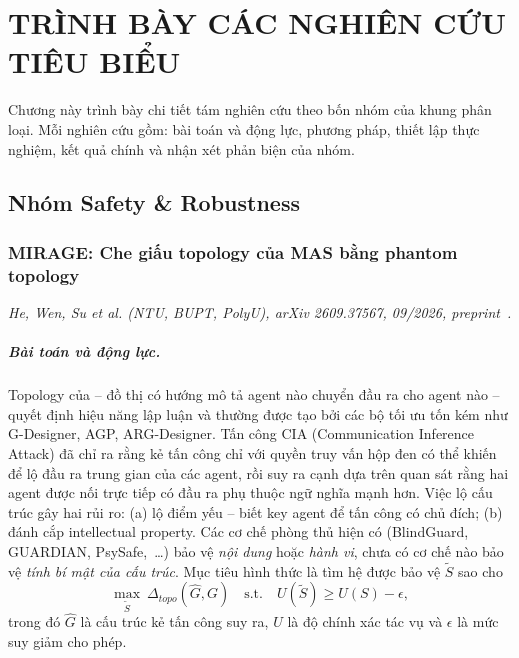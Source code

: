 \chapter{TRÌNH BÀY CÁC NGHIÊN CỨU TIÊU BIỂU}
\label{chap:papers}

Chương này trình bày chi tiết tám nghiên cứu theo bốn nhóm của khung phân loại. Mỗi nghiên cứu gồm: bài toán và động lực, phương pháp, thiết lập thực nghiệm, kết quả chính và nhận xét phản biện của nhóm.

\section{Nhóm Safety \& Robustness}

\subsection{MIRAGE: Che giấu topology của MAS bằng phantom topology}
\label{sec:mirage}

\noindent\textit{He, Wen, Su et al. (NTU, BUPT, PolyU), arXiv 2609.37567, 09/2026, preprint~\cite{p1mirage}.}

\paragraph{Bài toán và động lực.} Topology của \MAS{} -- đồ thị có hướng mô tả agent nào chuyển đầu ra cho agent nào -- quyết định hiệu năng lập luận và thường được tạo bởi các bộ tối ưu tốn kém như G-Designer, AGP, ARG-Designer. Tấn công CIA (Communication Inference Attack) đã chỉ ra rằng kẻ tấn công chỉ với quyền truy vấn hộp đen có thể khiến \MAS{} để lộ đầu ra trung gian của các agent, rồi suy ra cạnh dựa trên quan sát rằng hai agent được nối trực tiếp có đầu ra phụ thuộc ngữ nghĩa mạnh hơn. Việc lộ cấu trúc gây hai rủi ro: (a) lộ điểm yếu -- biết key agent để tấn công có chủ đích; (b) đánh cắp intellectual property. Các cơ chế phòng thủ \MAS{} hiện có (BlindGuard, GUARDIAN, PsySafe,~\ldots) bảo vệ \emph{nội dung} hoặc \emph{hành vi}, chưa có cơ chế nào bảo vệ \emph{tính bí mật của cấu trúc}. Mục tiêu hình thức là tìm hệ được bảo vệ $\tilde S$ sao cho
\begin{equation}
  \max_{\tilde S}\ \Delta_{topo}(\hat G, G) \quad \text{s.t.}\quad U(\tilde S) \ge U(S) - \epsilon,
\end{equation}
trong đó $\hat G$ là cấu trúc kẻ tấn công suy ra, $U$ là độ chính xác tác vụ và $\epsilon$ là mức suy giảm cho phép.

